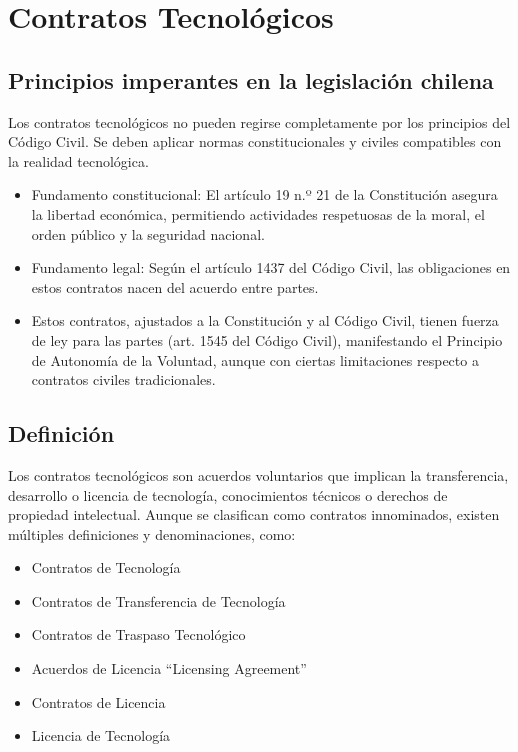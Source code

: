 \documentclass{templateNote}
\begin{document}
\newpage
\section{Contratos Tecnológicos}
\subsection{Principios imperantes en la legislación chilena}

Los contratos tecnológicos no pueden regirse completamente por los principios del Código Civil. Se deben aplicar normas constitucionales y civiles compatibles con la realidad tecnológica.
\begin{itemize}
    \item Fundamento constitucional: El artículo 19 n.º 21 de la Constitución asegura la libertad económica, permitiendo actividades respetuosas de la moral, el orden público y la seguridad nacional.
    \item Fundamento legal: Según el artículo 1437 del Código Civil, las obligaciones en estos contratos nacen del acuerdo entre partes.
    \item Estos contratos, ajustados a la Constitución y al Código Civil, tienen fuerza de ley para las partes (art. 1545 del Código Civil), manifestando el Principio de Autonomía de la Voluntad, aunque con ciertas limitaciones respecto a contratos civiles tradicionales.
\end{itemize}

\subsection{Definición}
Los contratos tecnológicos son acuerdos voluntarios que implican la transferencia, desarrollo o licencia de tecnología, conocimientos técnicos o derechos de propiedad intelectual. Aunque se clasifican como contratos innominados, existen múltiples definiciones y denominaciones, como:
\begin{itemize}
    \item Contratos de Tecnología
    \item Contratos de Transferencia de Tecnología
    \item Contratos de Traspaso Tecnológico
    \item Acuerdos de Licencia “Licensing Agreement”
    \item Contratos de Licencia
    \item Licencia de Tecnología
\end{itemize}
\end{document}
